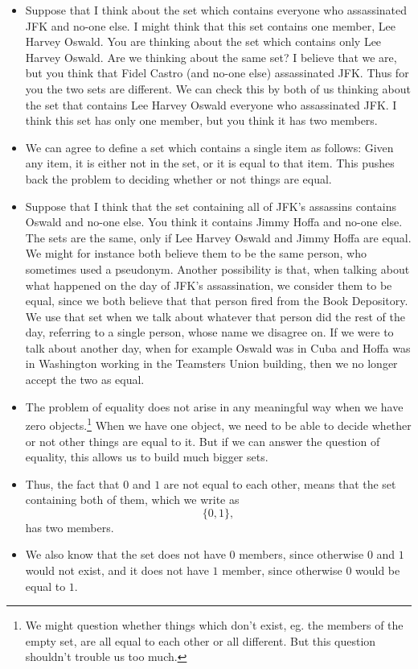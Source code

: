 \begin{itemize}
\item
Suppose that I think about the set which contains everyone who assassinated JFK and no-one else. I might think that this set contains one member, Lee Harvey Oswald. You are thinking about the set which contains only Lee Harvey Oswald. Are we thinking about the same set? I believe that we are, but you think that Fidel Castro (and no-one else) assassinated JFK. Thus for you the two sets are different. We can check this by both of us thinking about the set that contains Lee Harvey Oswald  everyone who assassinated JFK. I think this set has only one member, but you think it has two members.
\item
We can agree to define a set which contains a single item as follows: Given any item, it is either not in the set, or it is equal to that item. This pushes back the problem to deciding whether or not things are equal. 
\item
Suppose that I think that the set containing all of JFK's assassins contains Oswald and no-one else. You think it contains Jimmy Hoffa and no-one else. The sets are the same, only if Lee Harvey Oswald and Jimmy Hoffa are equal. We might for instance both believe them to be the same person, who sometimes used a pseudonym. Another possibility is that, when talking about what happened on the day of JFK's assassination, we consider them to be equal, since we both believe that that person fired from the Book Depository. We use that set when we talk about whatever that person did the rest of the day, referring to a single person, whose name we disagree on. If we were to talk about another day, when for example Oswald was in Cuba and Hoffa was in Washington working in the Teamsters Union building, then we no longer accept the two as equal.
\item
The problem of equality does not arise in any meaningful way when we have zero objects.\footnote{We might question whether things which don't exist, eg. the members of the empty set, are all equal to each other or all different. But this question shouldn't trouble us too much.} When we have one object, we need to be able to decide whether or not other things are equal to it. But if we can answer the question of equality, this allows us to build much bigger sets.
\item
Thus, the fact that $0$ and $1$ are not equal to each other, means that the set containing both of them, which we write as \[\{0, 1\},\] has two members.
\item
We also know that the set does not have $0$ members, since otherwise $0$ and $1$ would not exist, and it does not have $1$ member, since otherwise $0$ would be equal to $1$.

\end{itemize}
